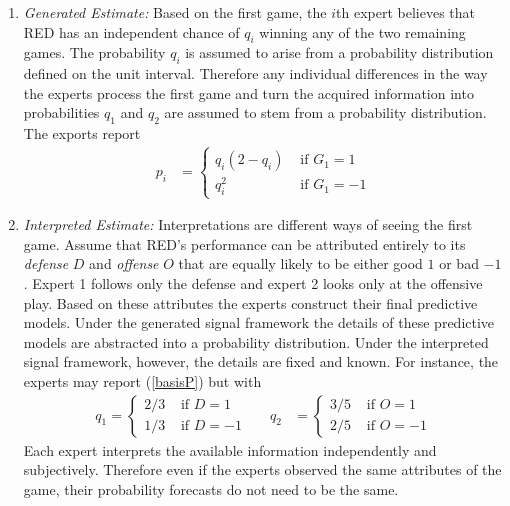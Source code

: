 \documentclass[11pt,twoside]{article}
\begin{document}
\begin{enumerate}
\item[] \textit{Generated Estimate:} Based on the first game, the $i$th expert believes that RED has an independent chance of $q_i$ winning any of the two remaining games. The probability $q_i$ is assumed to arise from a probability distribution defined on the unit interval. Therefore any individual differences in the way the experts process the first game and turn the acquired information into probabilities $q_1$ and $q_2$ are assumed to stem from a probability distribution. The exports report
\begin{align}
p_i &= \begin{cases}
q_i(2-q_i) & \text{ if } G_1 = 1\\
q_i^2 & \text{ if } G_1 = -1
\end{cases}
\label{basisP}
\end{align}

\item[] \textit{Interpreted Estimate:} Interpretations are different ways of seeing the first game. Assume that RED's performance can be attributed entirely to its \textit{defense} $D$ and \textit{offense} $O$ that are equally likely to be either good $1$ or bad $-1$. Expert 1 follows only the defense and expert 2 looks only at the offensive play. Based on these attributes the experts construct their final predictive models. Under the generated signal framework the details of these predictive models are abstracted into a probability distribution. Under the interpreted signal framework, however, the details are fixed and known. For instance, the experts may report (\ref{basisP}) but with
\begin{align*}
q_1 = \begin{cases}
2/3 & \text{ if } D = 1\\
1/3 &  \text{ if } D = -1
\end{cases}
&& q_2 &= \begin{cases}
3/5 & \text{ if } O = 1\\
2/5 & \text{ if } O = -1
\end{cases}
\end{align*}
Each expert interprets the available information independently and subjectively.  Therefore even if the experts observed the same attributes of the game, their probability forecasts do not need to be the same. 



\end{enumerate}
\end{document}

